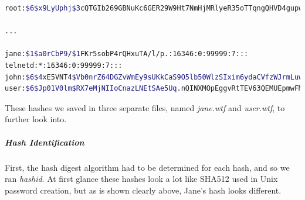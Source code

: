 
\lstset{extendedchars=\true}
\lstset{inputencoding=ansinew}

\begin{lstlisting}[language=bash,caption={/etc/shadow}]
root:$6$x9LyUphj$3cQTGIb269GBNuKc6GER29W9Ht7NmHjMRlyeR35oTTqngQHVD4gupwzSmjhAYOc6KEyfGQ32De27SgOCNzKcE.:16371:0:99999:7:::

...

jane:$1$a0rCbP9/$1FKr5sobP4rQHxuTA/l/p.:16346:0:99999:7:::
telnetd:*:16346:0:99999:7:::
john:$6$4xE5VNT4$Vb0nrZ64DGZvWmEy9sUKkCaS9O5lb50WlzSIxim6ydaCVfzWJrmLuwZIPxjgw1ZDIeQB9C9jX7qb7AtiDibjo0:16346:0:99999:7:::
user:$6$Jp01V0lm$RX7eMjNIIoCnazLNEtSAe5Uq.nQINXMOpEggvRtTEV63QEMUEpmwFMJhYzQtLT/M33Kbl5Mhr59tPJbvN/u4k1:16346:0:99999:7:::
\end{lstlisting}

These hashes we saved in three separate files, named \textit{jane.wtf} and \textit{user.wtf}, to further look into.

\subparagraph{Hash Identification}
First, the hash digest algorithm had to be determined for each hash, and so we ran \textit{hashid}. At first glance these hashes look a lot like SHA512 used in Unix password creation, but as is shown clearly above, Jane's hash looks different.

